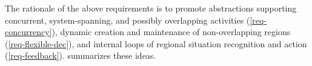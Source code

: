 The rationale of the above requirements %
 is to promote abstractions 
 supporting concurrent, system-spanning, and possibly overlapping activities (\ref{req-concurrency}),
 dynamic creation and maintenance of non-overlapping regions (\ref{req-flexible-dec}),
 and 
 internal loops of regional situation recognition and action
 (\ref{req-feedback}).
  summarizes these ideas.

